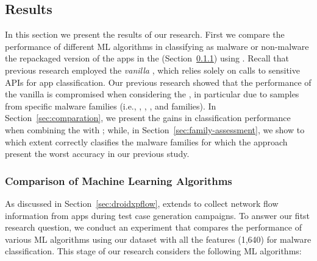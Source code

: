 \subsection{Results}\label{sec:results}




In this section we present the results of our research.
First we compare the performance of different ML algorithms in classifying
as malware or non-malware the repackaged version of the apps in the \fds (Section~\ref{sec:ml}) using \droidxpflow.
Recall that previous research employed the \emph{vanilla}
\mas, which relies solely on calls to sensitive APIs for app classification. Our previous
research showed that the performance of the vanilla \mas is compromised when considering
the \cds, in particular due to samples from specific malware families (i.e., \gps, \rmb, \dwg, and \tjk families).
In Section~\ref{sec:comparation}, we present the gains in classification performance when combining
the \mas with \droidxpflow; while, in Section~\ref{sec:family-assessment}, we show to which extent
\droidxpflow correctly clasifies the malware families for which the \mas approach
present the worst accuracy in our previous study.

\subsubsection{Comparison of Machine Learning Algorithms}\label{sec:ml}

As discussed in Section~\ref{sec:droidxpflow}, \droidxpflow extends \droidxp to collect network
flow information from apps during test case generation campaigns. To answer our fitst research question,
we conduct an experiment that compares the performance of various ML algorithms using our \fds dataset with all the features (1,640)
for malware classification. This stage of our research considers the following ML algorithms:

